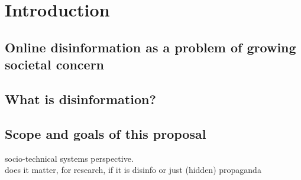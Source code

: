 \section{Introduction}

\subsection{Online disinformation as a problem of growing societal concern}

\subsection{What is disinformation?}

\subsection{Scope and goals of this proposal}
socio-technical systems perspective. \\
does it matter, for research, if it is disinfo or just (hidden) propaganda